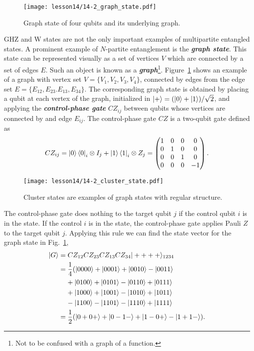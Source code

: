 \begin{figure}[t]
    \centering
    \texttt{[image: lesson14/14-2\_graph\_state.pdf]}
    \caption[Graph state.]{Graph state of four qubits and its underlying graph.}
    \label{fig:14-2_graph_state}
\end{figure}

GHZ and W states are not the only important examples of multipartite entangled states.
A prominent example of $N$-partite entanglement is the \textbf{\textit{graph state}}.
This state can be represented visually as a set of vertices $V$ which are connected by a set of edges $E$.
Such an object is known as a \textit{\textbf{graph}}\footnote{Not to be confused with a graph of a function.}.
Figure~\ref{fig:14-2_graph_state} shows an example of a graph with vertex set $V=\{V_1, V_2, V_3, V_4\}$, connected by edges from the edge set $E=\{ E_{12}, E_{23}. E_{13}, E_{34} \}$.
The corresponding graph state is obtained by placing a qubit at each vertex of the graph, initialized in $\left| + \right\rangle = (\left| 0 \right\rangle + \left| 1 \right\rangle) / \sqrt{2}$, and applying the \textbf{\emph{control-phase gate}} $CZ_{ij}$ between qubits whose vertices are connected by and edge $E_{ij}$.
The control-phase gate $CZ$ is a two-qubit gate defined as
\begin{equation}
    CZ_{ij} = \left| 0 \right\rangle\left\langle 0 \right|_i \otimes I_j + \left| 1 \right\rangle\left\langle 1 \right|_i \otimes Z_j = \begin{pmatrix}
        1 & 0 & 0 & 0 \\
        0 & 1 & 0 & 0 \\
        0 & 0 & 1 & 0 \\
        0 & 0 & 0 & -1
    \end{pmatrix}.
\end{equation}
\begin{figure}[t]
    \centering
    \texttt{[image: lesson14/14-2\_cluster\_state.pdf]}
    \caption[Cluster state.]{Cluster states are examples of graph states with regular structure.}
    \label{fig:14-2_cluster_state}
\end{figure}
The control-phase gate does nothing to the target qubit $j$ if the control qubit $i$ is in the  state.
If the control $i$ is in the  state, the control-phase gate applies Pauli $Z$ to the target qubit $j$.
Applying this rule we can find the state vector for the graph state  in Fig.~\ref{fig:14-2_graph_state},
\begin{align}
    \left| G \right\rangle & = CZ_{12} CZ_{23} CZ_{13} CZ_{34} |++++\rangle_{1234} \nonumber\\
    & = \frac{1}{4} ( |0000\rangle + |0001\rangle + |0010\rangle - |0011\rangle \nonumber\\
    & \; \; \; \; + |0100\rangle + |0101\rangle - |0110\rangle + |0111\rangle \\
    & \; \; \; \; + |1000\rangle + |1001\rangle - |1010\rangle + |1011\rangle \\
    & \; \; \; \; - |1100\rangle - |1101\rangle - |1110\rangle + |1111\rangle \\
    & = \frac{1}{2} ( |0+0+\rangle + |0-1-\rangle + |1-0+\rangle - |1+1-\rangle ).
\end{align}
